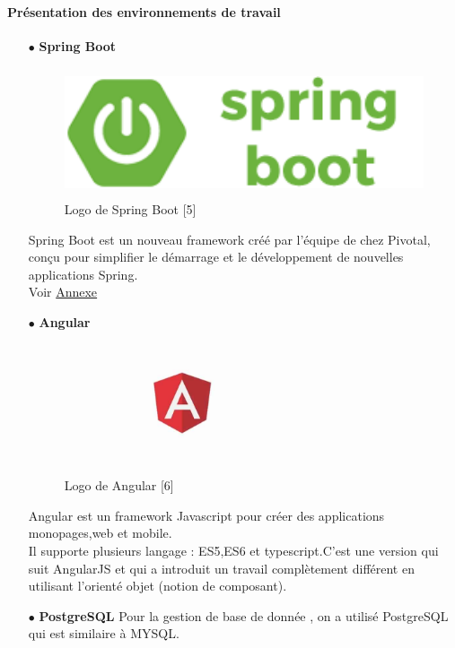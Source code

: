\documentclass{article}
\begin{document}
\paragraph{Présentation des environnements de travail}
\begin{enumerate}
\item [$\bullet$] \textbf{Spring Boot}
\begin{figure}[H]
\centering
\includegraphics[height=1.5in]{springboot.png}
\caption[Figure4 : Logo de Spring Boot ]{Logo de Spring Boot [5]}
\label{fig:pic4}
\end{figure}
Spring Boot est un nouveau framework créé par l'équipe de chez Pivotal, conçu pour simplifier le démarrage et le développement de nouvelles applications Spring.\\
Voir \hyperref[sec:hello3]{Annexe}
\item [$\bullet$] \textbf{Angular}
\begin{figure}[H]
\centering
\includegraphics[height=1.5in]{angular-2-logo.jpg}
\caption[Figure5 : Logo de Angular  ]{Logo de Angular [6]}
\label{fig:pic5}
\end{figure}
Angular est un framework Javascript pour créer des applications monopages,web et mobile.\\
Il supporte plusieurs langage : ES5,ES6 et typescript.C'est une version qui suit AngularJS et qui a introduit un travail complètement différent en utilisant l'orienté objet (notion de composant).
\item [$\bullet$] \textbf{PostgreSQL}
Pour la gestion de base de donnée , on a utilisé PostgreSQL qui est similaire à MYSQL.
\end{enumerate}
\end{document}
